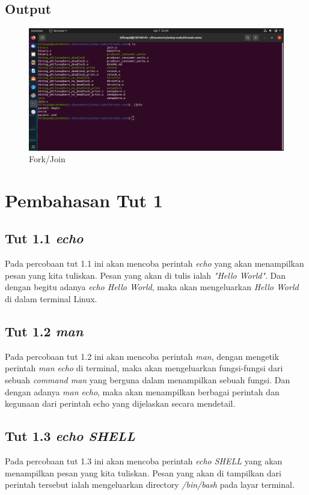 \documentclass[11pt,a4paper]{article}
\begin{document}
\subsection{Output}
\begin{figure}[h]
	\centering
	\includegraphics[scale = 0.8]{Figure/fork.png}
	\caption{Fork/Join}
\end{figure}


\section{Pembahasan Tut 1}
\subsection{Tut 1.1 \textit{echo}}
	Pada percobaan tut 1.1 ini akan mencoba perintah \textit{echo} yang akan menampilkan pesan yang kita tuliskan. Pesan yang akan 
	di tulis ialah \textit{"Hello World"}. Dan dengan begitu adanya \textit{echo Hello World}, maka akan mengeluarkan \textit{Hello World} 
	di dalam terminal Linux.
	

\subsection{Tut 1.2 \textit{man}}
    Pada percobaan tut 1.2 ini akan mencoba perintah \textit{man}, dengan mengetik perintah \textit{man echo} di terminal, maka akan 
	mengeluarkan fungsi-fungsi dari sebuah \textit{command man} yang berguna dalam menampilkan sebuah fungsi. Dan dengan adanya \textit{man echo},
	maka akan menampilkan berbagai perintah dan kegunaan dari perintah echo yang dijelaskan secara mendetail.
	

\subsection{Tut 1.3 \textit{echo SHELL}}
	Pada percobaan tut 1.3 ini akan mencoba perintah \textit{echo SHELL} yang akan menampilkan pesan yang kita tuliskan. Pesan yang akan
	di tampilkan dari perintah tersebut ialah mengeluarkan directory \textit{/bin/bash} pada layar terminal.
	
\end{document}
